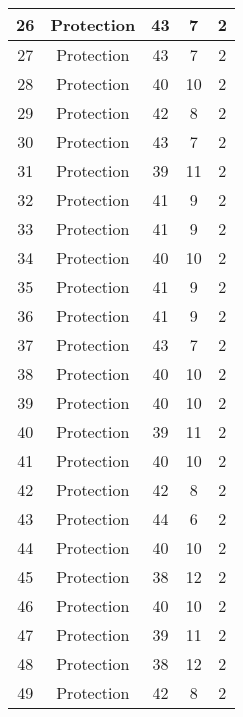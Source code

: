\documentclass[results.tex]{subfiles}
\begin{document}
\begin{center}
\begin{tabular}{| c || c | c | c | c |}
    \hline
    26 & Protection & 43 & 7 & 2 \\ 
    \hline
    27 & Protection & 43 & 7 & 2 \\ 
    \hline
    28 & Protection & 40 & 10 & 2 \\ 
    \hline
    29 & Protection & 42 & 8 & 2 \\ 
    \hline
    30 & Protection & 43 & 7 & 2 \\ 
    \hline
    31 & Protection & 39 & 11 & 2 \\ 
    \hline
    32 & Protection & 41 & 9 & 2 \\ 
    \hline
    33 & Protection & 41 & 9 & 2 \\ 
    \hline
    34 & Protection & 40 & 10 & 2 \\ 
    \hline
    35 & Protection & 41 & 9 & 2 \\ 
    \hline
    36 & Protection & 41 & 9 & 2 \\ 
    \hline
    37 & Protection & 43 & 7 & 2 \\ 
    \hline
    38 & Protection & 40 & 10 & 2 \\ 
    \hline
    39 & Protection & 40 & 10 & 2 \\ 
    \hline
    40 & Protection & 39 & 11 & 2 \\ 
    \hline
    41 & Protection & 40 & 10 & 2 \\ 
    \hline
    42 & Protection & 42 & 8 & 2 \\ 
    \hline
    43 & Protection & 44 & 6 & 2 \\ 
    \hline
    44 & Protection & 40 & 10 & 2 \\ 
    \hline
    45 & Protection & 38 & 12 & 2 \\ 
    \hline
    46 & Protection & 40 & 10 & 2 \\ 
    \hline
    47 & Protection & 39 & 11 & 2 \\ 
    \hline
    48 & Protection & 38 & 12 & 2 \\ 
    \hline
    49 & Protection & 42 & 8 & 2 \\ 
    \hline   \end{tabular}
\end{center}
\end{document}

